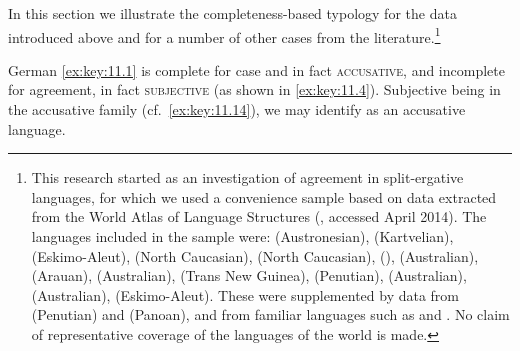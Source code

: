 \documentclass[output=paper]{langsci/langscibook}
\begin{document}
In this section we illustrate the completeness-based typology for the data
introduced above and for a number of other cases from the
literature.\footnote{This research started as an investigation of agreement in
    split-ergative languages, for which we used a convenience sample based on
    data extracted from the World Atlas of Language Structures
    (\citealt{DryHas2013}, accessed April 2014). The languages included in the
    sample were:  (Austronesian),  (Kartvelian),
     (Eskimo-Aleut),  (North Caucasian),
     (North Caucasian),  (), 
    (Australian),  (Arauan),  (Australian),
     (Trans New Guinea),  (Penutian),
     (Australian),  (Australian), 
    (Eskimo-Aleut). These were supplemented by data from 
(Penutian) and  (Panoan), and from familiar 
languages such as  and . No claim of representative coverage of
the languages of the world is made.}

German \eqref{ex:key:11.1} is complete for case and in fact
\textsc{accusative}, and incomplete for agreement, in fact \textsc{subjective}
(as shown in \eqref{ex:key:11.4}). Subjective being in the accusative family
(cf.\ \eqref{ex:key:11.14}), we may identify  as an accusative
language.
\end{document}
